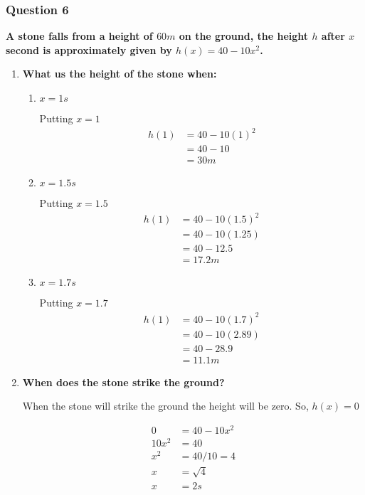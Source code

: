 \documentclass[crop=false,fleqn]{standalone}
\begin{document}
    \subsubsection{Question 6}
    \textbf{
        A stone falls from a height of $60m$ on the ground, the height $h$
        after $x$ second is approximately given by $h(x)=40-10x^2$.
    }

    \begin{enumerate}
        \item \textbf{What us the height of the stone when:}
        \begin{enumerate}
            \item $x = 1s$
            
            Putting $x=1$
            \begin{align*}
                h(1) &= 40-10(1)^2 \\
                    &= 40-10 \\
                    &= 30m
            \end{align*}

            \item $x = 1.5s$
            
            Putting $x=1.5$
            \begin{align*}
                h(1) &= 40-10(1.5)^2 \\
                    &= 40-10(1.25) \\
                    &= 40-12.5 \\
                    &= 17.2m
            \end{align*}

            \item $x = 1.7s$
            
            Putting $x=1.7$
            \begin{align*}
                h(1) &= 40-10(1.7)^2 \\
                    &= 40-10(2.89) \\
                    &= 40-28.9 \\
                    &= 11.1m
            \end{align*}
        \end{enumerate}

        
        \item \textbf{When does the stone strike the ground?}
        
        When the stone will strike the ground the height will be zero. So, $h(x)=0$

        \begin{align*}
            0 &= 40-10x^2 \\
            10x^2 &= 40 \\
            x^2 &= 40/10 = 4 \\
            x &= \sqrt{4} \\
            x &= 2s
        \end{align*}
    \end{enumerate}
\end{document}
